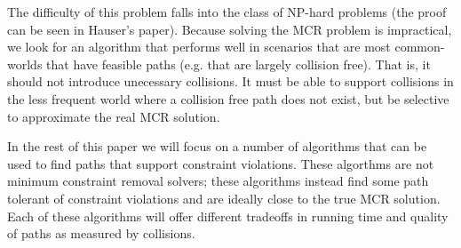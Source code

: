 The difficulty of this problem falls into the class of NP-hard problems (the proof can be seen in Hauser's paper). Because solving the MCR problem is impractical, we look for an algorithm that performs well in scenarios that are most common- worlds that have feasible paths (e.g. that are largely collision free). That is, it should not introduce unecessary collisions. It must be able to support collisions in the less frequent world where a collision free path does not exist, but be selective to approximate the real MCR solution.

In the rest of this paper we will focus on a number of algorithms that can be used to find paths that support constraint violations. These algorthms are not minimum constraint removal solvers; these algorithms instead find some path tolerant of constraint violations and are ideally close to the true MCR solution. Each of these algorithms will offer different tradeoffs in running time and quality of paths as measured by collisions.
